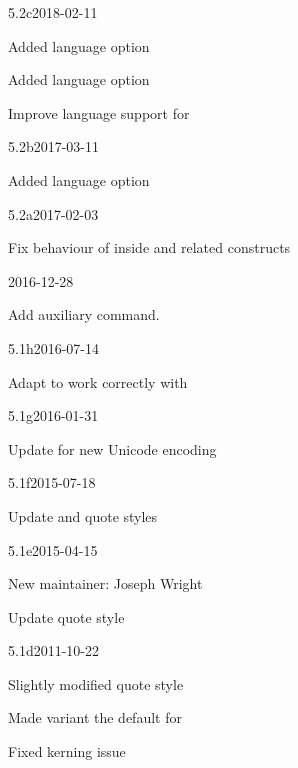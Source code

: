 \documentclass{ltxdockit}[2010/09/26]
\begin{document}
\begin{changelog}
\begin{release}{5.2c}{2018-02-11}
\item Added language option 
\item Added language option 
\item Improve language support for 
\end{release}

\begin{release}{5.2b}{2017-03-11}
\item Added language option 
\end{release}

\begin{release}{5.2a}{2017-02-03}
	\item Fix behaviour of  inside  and
	  related constructs
\end{release}

\begin{release}{5.2}{2016-12-28}
	\item Add  auxiliary command.
\end{release}

\begin{release}{5.1h}{2016-07-14}
\item Adapt  to work correctly with \luatex
\end{release}

\begin{release}{5.1g}{2016-01-31}
\item Update for new  Unicode encoding
\end{release}

\begin{release}{5.1f}{2015-07-18}
\item Update  and  quote styles
\end{release}

\begin{release}{5.1e}{2015-04-15}
\item New maintainer: Joseph Wright
\item Update  quote style
\end{release}

\begin{release}{5.1d}{2011-10-22}
\item Slightly modified quote style 
\item Made variant  the default for 
\item Fixed \xetex kerning issue
\end{release}


\end{changelog}
\end{document}
